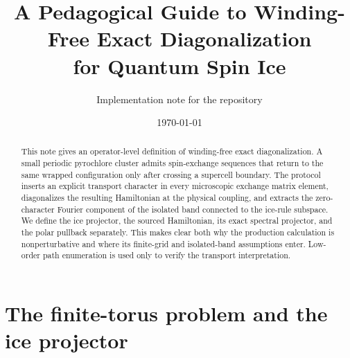 \documentclass[11pt]{article}
\title{A Pedagogical Guide to Winding-Free Exact Diagonalization\\
for Quantum Spin Ice}
\author{Implementation note for the \code{twist\_qsi\_demo} repository}
\date{\today}
\begin{document}
\maketitle

\begin{abstract}
This note gives an operator-level definition of winding-free exact
diagonalization.  A small periodic pyrochlore cluster admits spin-exchange
sequences that return to the same wrapped configuration only after crossing a
supercell boundary.  The protocol inserts an explicit transport character in
every microscopic exchange matrix element, diagonalizes the resulting
Hamiltonian at the physical coupling, and extracts the zero-character Fourier
component of the isolated band connected to the ice-rule subspace.  We define
the ice projector, the sourced Hamiltonian, its exact spectral projector, and
the polar pullback separately.  This makes clear both why the production
calculation is nonperturbative and where its finite-grid and isolated-band
assumptions enter.  Low-order path enumeration is used only to verify the
transport interpretation.
\end{abstract}

\tableofcontents

\section{The finite-torus problem and the ice projector}
\end{document}
